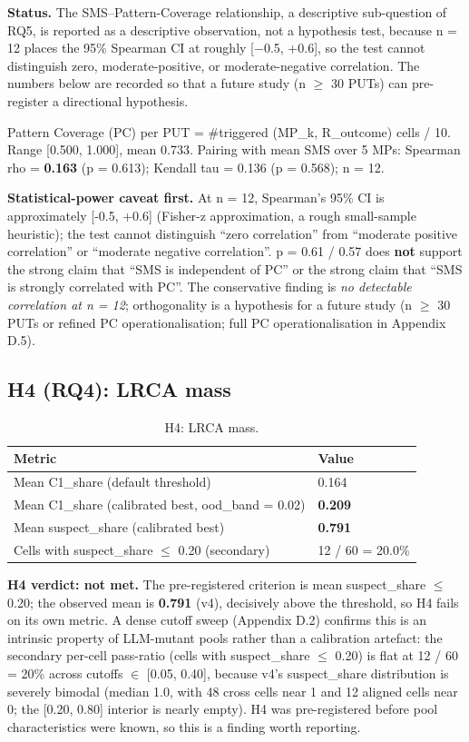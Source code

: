 \documentclass[manuscript,screen,review]{acmart}
\begin{document}
\textbf{Status.} The SMS--Pattern-Coverage relationship, a descriptive
sub-question of RQ5, is reported as a descriptive observation, not a
hypothesis test, because n = 12 places the 95\% Spearman CI at roughly
{[}$-$0.5, +0.6{]}, so the test cannot distinguish zero,
moderate-positive, or moderate-negative correlation. The numbers below
are recorded so that a future study (n $\geq$ 30 PUTs) can pre-register a directional
hypothesis.

Pattern Coverage (PC) per PUT = \#triggered (MP\_k, R\_outcome) cells /
10. Range {[}0.500, 1.000{]}, mean 0.733. Pairing with mean SMS over 5
MPs: Spearman rho = \textbf{0.163} (p = 0.613); Kendall tau = 0.136 (p =
0.568); n = 12.

\textbf{Statistical-power caveat first.} At n = 12, Spearman's 95\% CI
is approximately {[}-0.5, +0.6{]} (Fisher-z approximation, a rough
small-sample heuristic); the test cannot distinguish ``zero
correlation'' from ``moderate positive correlation'' or ``moderate
negative correlation''. p = 0.61 / 0.57 does \textbf{not} support the
strong claim that ``SMS is independent of PC'' or the strong claim that
``SMS is strongly correlated with PC''. The conservative finding is
\emph{no detectable correlation at n = 12}; orthogonality is a
hypothesis for a future study (n $\geq$ 30 PUTs or refined PC operationalisation; full PC
operationalisation in Appendix D.5).

\subsection{H4 (RQ4): LRCA mass}\label{h5-lrca-mass}

{%
\begin{longtable}[]{@{}ll@{}}
\caption{H4: LRCA mass.}\label{tab:p2-13}\\
\toprule\noalign{}
Metric & Value \\
\midrule\noalign{}
\endhead
\bottomrule\noalign{}
\endlastfoot
Mean C1\_share (default threshold) & 0.164 \\
Mean C1\_share (calibrated best, ood\_band = 0.02) & \textbf{0.209} \\
Mean suspect\_share (calibrated best) & \textbf{0.791} \\
Cells with suspect\_share $\leq$ 0.20 (secondary) & 12 / 60 = 20.0\% \\
\end{longtable}
}

\textbf{H4 verdict: not met.} The pre-registered criterion is mean
suspect\_share $\leq$ 0.20; the observed mean is \textbf{0.791} (v4),
decisively above the threshold, so H4 fails on its own metric. A dense
cutoff sweep (Appendix D.2) confirms this is an intrinsic property of
LLM-mutant pools rather than a calibration artefact: the secondary
per-cell pass-ratio (cells with suspect\_share $\leq$ 0.20) is flat at
12 / 60 = 20\% across cutoffs $\in$ {[}0.05, 0.40{]}, because v4's
suspect\_share distribution is severely bimodal (median 1.0, with 48
cross cells near 1 and 12 aligned cells near 0; the {[}0.20, 0.80{]}
interior is nearly empty). H4 was pre-registered before pool
characteristics were known, so this is a finding worth reporting.
\end{document}
